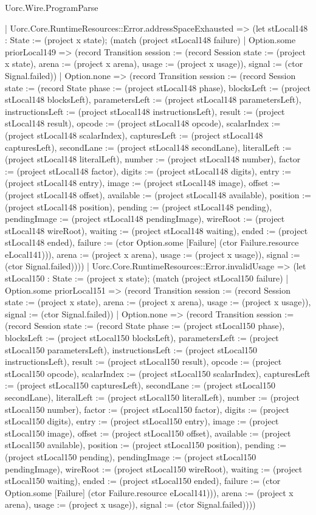 \begin{lexlean}{Uorc.Wire.ProgramParse}
\begin{semanticmodule}
{      | Uorc.Core.RuntimeResources::Error.addressSpaceExhausted => (let stLocal148 : State := (project x state); (match (project stLocal148 failure)
        | Option.some priorLocal149 => (record Transition {session := (record Session {state := (project x state), arena := (project x arena), usage := (project x usage)}), signal := (ctor Signal.failed)})
        | Option.none => (record Transition {session := (record Session {state := (record State {phase := (project stLocal148 phase), blocksLeft := (project stLocal148 blocksLeft), parametersLeft := (project stLocal148 parametersLeft), instructionsLeft := (project stLocal148 instructionsLeft), result := (project stLocal148 result), opcode := (project stLocal148 opcode), scalarIndex := (project stLocal148 scalarIndex), capturesLeft := (project stLocal148 capturesLeft), secondLane := (project stLocal148 secondLane), literalLeft := (project stLocal148 literalLeft), number := (project stLocal148 number), factor := (project stLocal148 factor), digits := (project stLocal148 digits), entry := (project stLocal148 entry), image := (project stLocal148 image), offset := (project stLocal148 offset), available := (project stLocal148 available), position := (project stLocal148 position), pending := (project stLocal148 pending), pendingImage := (project stLocal148 pendingImage), wireRoot := (project stLocal148 wireRoot), waiting := (project stLocal148 waiting), ended := (project stLocal148 ended), failure := (ctor Option.some [Failure] (ctor Failure.resource eLocal141))}), arena := (project x arena), usage := (project x usage)}), signal := (ctor Signal.failed)})))
      | Uorc.Core.RuntimeResources::Error.invalidUsage => (let stLocal150 : State := (project x state); (match (project stLocal150 failure)
        | Option.some priorLocal151 => (record Transition {session := (record Session {state := (project x state), arena := (project x arena), usage := (project x usage)}), signal := (ctor Signal.failed)})
        | Option.none => (record Transition {session := (record Session {state := (record State {phase := (project stLocal150 phase), blocksLeft := (project stLocal150 blocksLeft), parametersLeft := (project stLocal150 parametersLeft), instructionsLeft := (project stLocal150 instructionsLeft), result := (project stLocal150 result), opcode := (project stLocal150 opcode), scalarIndex := (project stLocal150 scalarIndex), capturesLeft := (project stLocal150 capturesLeft), secondLane := (project stLocal150 secondLane), literalLeft := (project stLocal150 literalLeft), number := (project stLocal150 number), factor := (project stLocal150 factor), digits := (project stLocal150 digits), entry := (project stLocal150 entry), image := (project stLocal150 image), offset := (project stLocal150 offset), available := (project stLocal150 available), position := (project stLocal150 position), pending := (project stLocal150 pending), pendingImage := (project stLocal150 pendingImage), wireRoot := (project stLocal150 wireRoot), waiting := (project stLocal150 waiting), ended := (project stLocal150 ended), failure := (ctor Option.some [Failure] (ctor Failure.resource eLocal141))}), arena := (project x arena), usage := (project x usage)}), signal := (ctor Signal.failed)})))
}
\end{semanticmodule}
\end{lexlean}
